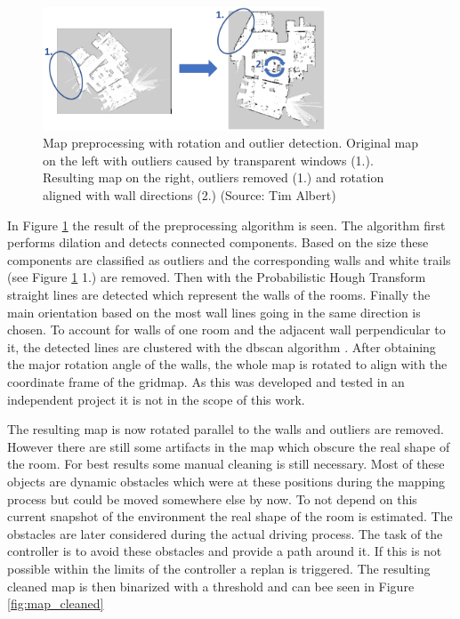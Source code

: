 \begin{figure}[h]
    \centering
    \includegraphics[width=0.75\textwidth]{figures/50_implementation/model_preprocessing_goal.png}
    \caption[Map preprocessing with rotation and outlier detection]{Map preprocessing with rotation and outlier detection. Original map on the left with outliers caused by transparent windows (1.). Resulting map on the right, outliers removed (1.) and rotation aligned with wall directions (2.) (Source: Tim Albert)}
    \label{fig:map_preprocessing}
\end{figure}

In Figure \ref{fig:map_preprocessing} the result of the preprocessing algorithm is seen. The algorithm first performs dilation and detects connected components. Based on the size these components are classified as outliers and the corresponding walls and white trails (see Figure \ref{fig:map_preprocessing} 1.) are removed. Then with the Probabilistic Hough Transform \cite{matas_robust_2000} straight lines are detected which represent the walls of the rooms. Finally the main orientation based on the most wall lines going in the same direction is chosen. To account for walls of one room and the adjacent wall perpendicular to it, the detected lines are clustered with the \gls{dbscan} algorithm \cite{ester_density-based_1996}. After obtaining the major rotation angle of the walls, the whole map is rotated to align with the coordinate frame of the gridmap. As this was developed and tested in an independent project it is not in the scope of this work.

The resulting map is now rotated parallel to the walls and outliers are removed. However there are still some artifacts in the map which obscure the real shape of the room. For best results some manual cleaning is still necessary. Most of these objects are dynamic obstacles which were at these positions during the mapping process but could be moved somewhere else by now. To not depend on this current snapshot of the environment the real shape of the room is estimated. The obstacles are later considered during the actual driving process. The task of the controller is to avoid these obstacles and provide a path around it. If this is not possible within the limits of the controller a replan is triggered. The resulting cleaned map is then binarized with a threshold and can bee seen in Figure \ref{fig:map_cleaned}

